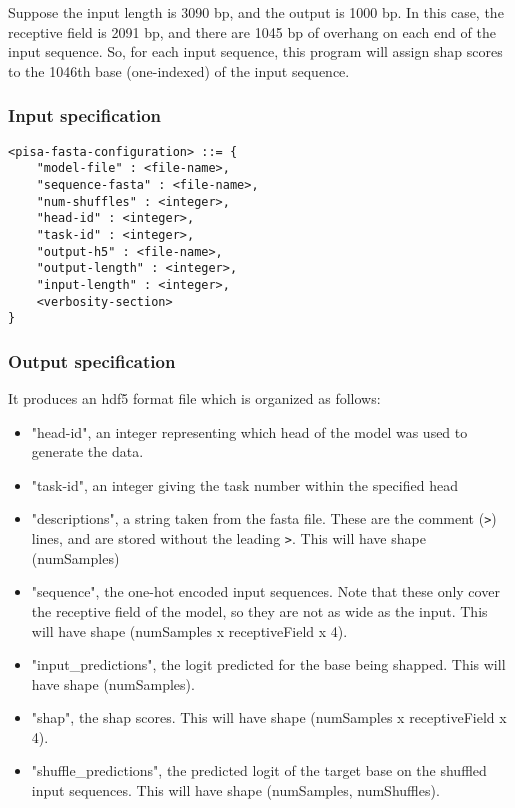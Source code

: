 \documentclass{article}
\begin{document}
Suppose the input length is 3090 bp, and the output is 1000 bp. 
In this case, the receptive field is 2091 bp, and there are 1045 bp of overhang on each end of the input sequence.
So, for each input sequence, this program will assign shap scores to the 1046th base (one-indexed) of the input sequence. 

\subsubsection{Input specification}
\begin{lstlisting}
<pisa-fasta-configuration> ::= {
    "model-file" : <file-name>,
    "sequence-fasta" : <file-name>,
    "num-shuffles" : <integer>,
    "head-id" : <integer>,
    "task-id" : <integer>,
    "output-h5" : <file-name>,
    "output-length" : <integer>,
    "input-length" : <integer>,
    <verbosity-section>
}
\end{lstlisting}

\subsubsection{Output specification}

It produces an hdf5 format file which is organized as follows:

\begin{itemize}
    \item "head-id", an integer representing which head of the model was used to generate the data.
    \item "task-id", an integer giving the task number within the specified head
    \item "descriptions", a string taken from the fasta file. These are the comment (\texttt{>}) lines, and are stored without the leading \texttt{>}. This will have shape (numSamples)
    \item "sequence", the one-hot encoded input sequences. Note that these only cover the receptive field of the model, so they are not as wide as the input. This will have shape (numSamples x receptiveField x 4).
    \item "input\_predictions", the logit predicted for the base being shapped. This will have shape (numSamples).
    \item "shap", the shap scores. This will have shape (numSamples x receptiveField x 4). 
    \item "shuffle\_predictions", the predicted logit of the target base on the shuffled input sequences. This will have shape (numSamples, numShuffles). 
\end{itemize}
\end{document}
